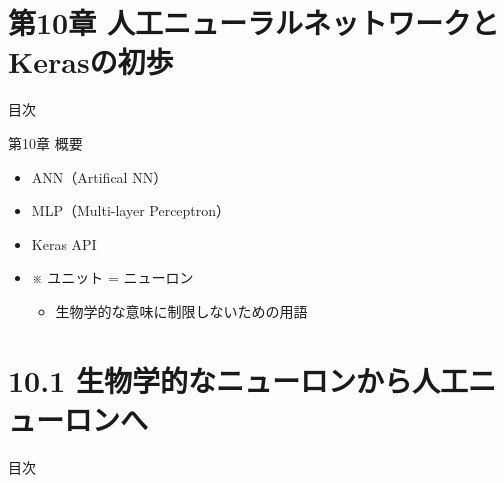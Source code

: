 \documentclass[aspectratio=169, dvipdfmx, 14pt, xcolor={svgnames,dvipsnames}]{beamer}
\def\tightlist{\itemsep1pt\parskip0pt\parsep0pt}
\begin{document}

\section{第10章 人工ニューラルネットワークとKerasの初歩}
\begin{frame}{\quad 目次}
  \tableofcontents[currentsection]
\end{frame}


\begin{frame}{\quad 第10章 概要}
  \begin{itemize}
    \tightlist
    \item
          ANN（Artifical NN）
    \item
          MLP（Multi-layer Perceptron）
    \item
          Keras API
    \item
          ※ ユニット = ニューロン

          \begin{itemize}
            \tightlist
            \item
                  生物学的な意味に制限しないための用語
          \end{itemize}
  \end{itemize}

\end{frame}


\hypertarget{ux751fux7269ux5b66ux7684ux306aux30cbux30e5ux30fcux30edux30f3ux304bux3089ux4ebaux5de5ux30cbux30e5ux30fcux30edux30f3ux3078}{%
  \section{10.1
    生物学的なニューロンから人工ニューロンへ}\label{ux751fux7269ux5b66ux7684ux306aux30cbux30e5ux30fcux30edux30f3ux304bux3089ux4ebaux5de5ux30cbux30e5ux30fcux30edux30f3ux3078}}
\begin{frame}{\quad 目次}
  \tableofcontents[currentsection]
\end{frame}

\end{document}
